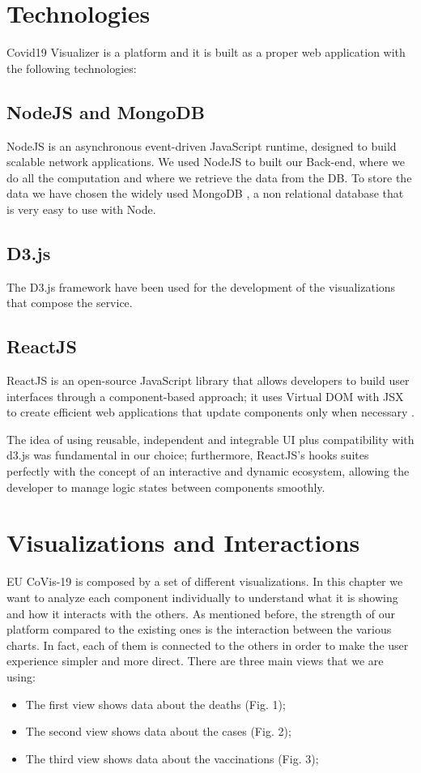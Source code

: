 \documentclass[10pt,conference]{IEEEtran}
\begin{document}
\section{Technologies}
Covid19 Visualizer is a platform and it is built as a proper web application with the following technologies:

\subsection{NodeJS and MongoDB}
NodeJS is an asynchronous event-driven JavaScript runtime, designed to build scalable network applications.
We used NodeJS \cite{node} to built our Back-end, where we do all the computation and where we retrieve the data from the DB. To store the data we have chosen the widely used
MongoDB \cite{mongo}, a non relational database that is very easy to use with Node.

\subsection{D3.js}
The D3.js framework \cite{d3} have been used for the development of the visualizations that compose the service.

\subsection{ReactJS}
ReactJS is an open-source JavaScript library that allows developers to build user interfaces through a component-based approach; it uses Virtual DOM with JSX to create efficient web applications that update components only when necessary \cite{react}.

The idea of using reusable, independent and integrable UI plus compatibility with d3.js was fundamental in our choice;
furthermore, ReactJS's hooks suites perfectly with the concept of an interactive and dynamic ecosystem, allowing the developer to manage logic states between components smoothly.


\section{Visualizations and Interactions}
EU CoVis-19 is composed by a set of different visualizations. In this chapter we want to analyze each component individually to understand what it
is showing and how it interacts with the others. As mentioned before, the strength of our platform compared to the existing ones is 
the interaction between the various charts. In fact, each of them is connected to the others in order to make the user experience 
simpler and more direct.
There are three main views that we are using:
\begin{itemize}
	\item The first view shows data about the deaths (Fig. 1);
	\item The second view shows data about the cases (Fig. 2);
	\item The third view shows data about the vaccinations (Fig. 3);
\end{itemize}
\end{document}
